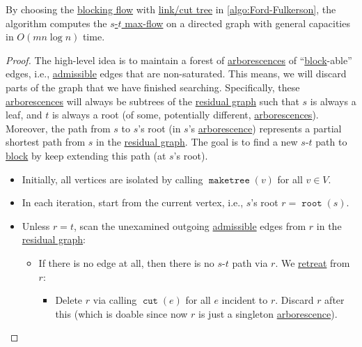 \begin{theorem}\label{thm:Ford-Fulkerson-link-cut-tree}
	By choosing the \hyperref[def:blocking-flow]{blocking flow} with \hyperref[def:link-cut-tree]{link/cut tree} in \autoref{algo:Ford-Fulkerson}, the algorithm computes the \hyperref[prb:s-t-max-flow]{\(s\)-\(t\) max-flow} on a directed graph with general capacities in \(O(mn \log n)\) time.
\end{theorem}
\begin{proof}
	The high-level idea is to maintain a forest of \hyperref[def:arborescence]{arborescences} of ``\hyperref[algo:general-adaptive-DFS-block]{block}-able'' edges, i.e., \hyperref[def:admissible]{admissible} edges that are non-saturated. This means, we will discard parts of the graph that we have finished searching. Specifically, these \hyperref[def:arborescence]{arborescences} will always be subtrees of the \hyperref[def:residual-graph]{residual graph} such that \(s\) is always a leaf, and \(t\) is always a root (of some, potentially different, \hyperref[def:arborescence]{arborescences}). Moreover, the path from \(s\) to \(s\)'s root (in \(s\)'s \hyperref[def:arborescence]{arborescence}) represents a partial shortest path from \(s\) in the \hyperref[def:residual-graph]{residual graph}. The goal is to find a new \(s\)-\(t\) path to \hyperref[algo:general-adaptive-DFS-block]{block} by keep extending this path (at \(s\)'s root).
	\begin{itemize}
		\item Initially, all vertices are isolated by calling \(\operatorname{\texttt{maketree}}(v) \) for all \(v \in V\).
		\item In each iteration, start from the current vertex, i.e., \(s\)'s root \(r = \operatorname{\texttt{root}}(s) \).
		\item Unless \(r = t\), scan the unexamined outgoing \hyperref[def:admissible]{admissible} edges from \(r\) in the \hyperref[def:residual-graph]{residual graph}:
		      \begin{itemize}
			      \item If there is no edge at all, then there is no \(s\)-\(t\) path via \(r\). We \hyperref[algo:general-adaptive-DFS-retreat]{retreat} from \(r\):
			            \begin{itemize}
				            \item Delete \(r\) via calling \(\operatorname{\texttt{cut}} (e)\) for all \(e\) incident to \(r\). Discard \(r\) after this (which is doable since now \(r\) is just a singleton \hyperref[def:arborescence]{arborescence}).

\end{itemize}
\end{itemize}
\end{itemize}
\end{proof}
